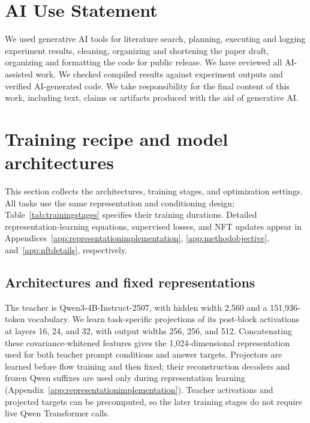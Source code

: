 \documentclass{article}
\begin{document}
\section*{AI Use Statement}
We used generative AI tools for literature search, planning, executing and logging experiment results, cleaning, organizing and shortening the paper draft, organizing and formatting the code for public release. We have reviewed all AI-assisted work. We checked compiled results against experiment outputs and verified AI-generated code. We take responsibility for the final content of this work, including text, claims or artifacts produced with the aid of generative AI.




\clearpage
\appendix
{}
\begingroup
\small\color{blue}
\renewcommand{\contentsname}{Appendix contents}
\tableofcontents
\endgroup
\clearpage
\section{Training recipe and model architectures}
\label{app:training}

This section collects the architectures, training stages, and optimization settings. All tasks use the same representation and conditioning design; Table~\ref{tab:trainingstages} specifies their training durations. Detailed representation-learning equations, supervised losses, and NFT updates appear in Appendices~\ref{app:representationimplementation}, \ref{app:methodobjective}, and~\ref{app:nftdetails}, respectively.

\subsection{Architectures and fixed representations}
\label{app:architecture}

The teacher is Qwen3-4B-Instruct-2507, with hidden width 2,560 and a 151,936-token vocabulary. We learn task-specific projections of its post-block activations at layers 16, 24, and 32, with output widths 256, 256, and 512. Concatenating these covariance-whitened features gives the 1,024-dimensional representation used for both teacher prompt conditions and answer targets. Projectors are learned before flow training and then fixed; their reconstruction decoders and frozen Qwen suffixes are used only during representation learning (Appendix~\ref{app:representationimplementation}). Teacher activations and projected targets can be precomputed, so the later training stages do not require live Qwen Transformer calls.
\end{document}
